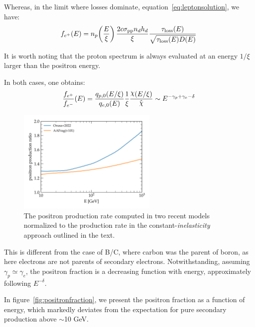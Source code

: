 Whereas, in the limit where losses dominate, equation~\eqref{eq:leptonsolution}, we have:
%
\begin{equation}
f_{e^+}(E) = 
n_p\!\left(\frac{E}{\xi} \right) \frac{2 c \sigma_{\rm pp} n_d h_d}{\xi}  \frac{\tau_{\rm loss}(E)}{\sqrt{\tau_{\rm loss}(E) D(E)}} 
\end{equation}

It is worth noting that the proton spectrum is always evaluated at an energy $1/\xi$ larger than the positron energy.

In both cases, one obtains:
%
\begin{equation} 
\frac{f_{e^+}}{f_{e^-}}(E) = \frac{q_{p,0}(E/\xi)}{q_{e,0}(E)} \frac{1}{\xi} \frac{\rchi(E / \xi)}{\hat\rchi} \sim E^{-\gamma_p+\gamma_e-\delta}
\label{eq:positronfractiontheory}
\end{equation}

\begin{figure}[t]
\centering
\includegraphics[width=0.6\textwidth]{figures/positron_source_term.pdf}
\caption{The positron production rate computed in two recent models~\cite{Kachelriess2019cpc,Orusa2022prd} normalized to the production rate in the constant-\emph{inelasticity} approach outlined in the text.}
\label{fig:positronsourceratio}
\end{figure}

This is different from the case of B/C, where carbon was the parent of boron,  as here electrons are not parents of secondary electrons.
%
Notwithstanding, assuming $\gamma_p \simeq \gamma_e$, the positron fraction is a decreasing function with energy, approximately following $E^{-\delta}$.

In figure~\ref{fig:positronfraction}, we present the positron fraction as a function of energy, which markedly deviates from the expectation for pure secondary production above $\sim$10 GeV.

